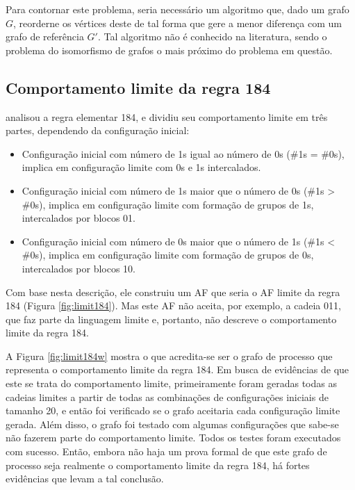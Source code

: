 \documentclass[12pt,a4paper]{article}
\begin{document}
Para contornar este problema, seria necessário um algoritmo que, dado
um grafo $G$, reorderne os vértices deste de tal forma que gere a menor
diferença com um grafo de referência $G'$. Tal algoritmo não é conhecido
na literatura, sendo o problema do isomorfismo de grafos o mais próximo do
problema em questão.

\subsection{Comportamento limite da regra 184}

 analisou a regra elementar 184, e dividiu seu
comportamento limite em três partes, dependendo da configuração inicial:

\begin{itemize}
\item Configuração inicial com número de 1s igual ao número de 0s
(\#1s = \#0s), implica em configuração limite com 0s e 1s
intercalados.

\item Configuração inicial com número de 1s maior que o número de 0s
(\#1s > \#0s), implica em configuração limite com formação de grupos de
1s, intercalados por blocos 01.

\item Configuração inicial com número de 0s maior que o número de 1s
(\#1s < \#0s), implica em configuração limite com formação de grupos
de 0s, intercalados por blocos 10.
\end{itemize}

Com base nesta descrição, ele construiu um AF que seria
o AF limite da regra 184 (Figura \ref{fig:limit184}). Mas este AF não
aceita, por exemplo, a cadeia 011, que faz parte da linguagem limite e,
portanto, não descreve o comportamento limite da regra 184.  

A Figura \ref{fig:limit184w} mostra o que acredita-se ser o grafo de processo
que representa o comportamento limite da regra 184. Em busca de evidências
de que este se trata do comportamento limite, primeiramente foram geradas
todas as cadeias limites a partir de todas as combinações de configurações
iniciais de tamanho 20, e então foi verificado se o grafo aceitaria cada
configuração limite gerada. Além disso, o grafo foi testado com algumas
configurações que sabe-se não fazerem parte do comportamento limite.
Todos os testes foram executados com sucesso.
Então, embora não haja um prova formal de que este grafo de processo seja
realmente o comportamento limite da regra 184, há fortes evidências que
levam a tal conclusão.
\end{document}
